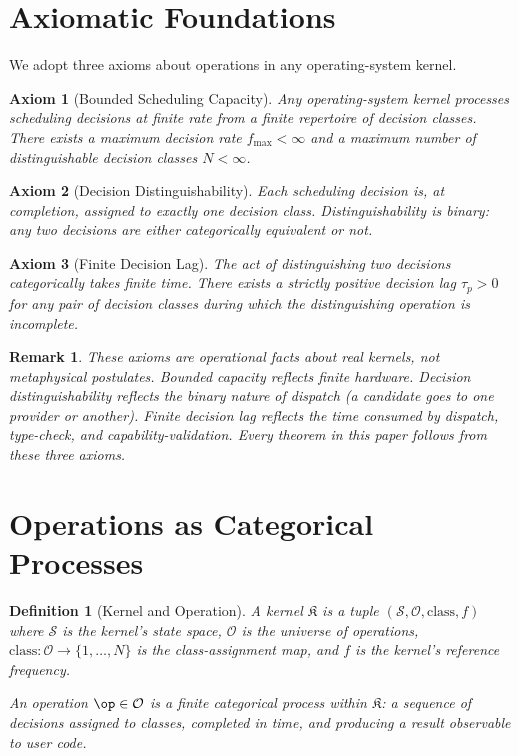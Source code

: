 \documentclass[twocolumn,11pt,a4paper]{article}
\newtheorem{definition}[theorem]{Definition}
\newtheorem{remark}[theorem]{Remark}
\newtheorem{axiom}{Axiom}
\newcommand{\Op}{\mathcal{O}}
\newcommand{\Kernel}{\mathfrak{K}}
\begin{document}
\section{Axiomatic Foundations}
\label{sec:axioms}

We adopt three axioms about operations in any operating-system kernel.

\begin{axiom}[Bounded Scheduling Capacity]
\label{ax:bounded}
Any operating-system kernel processes scheduling decisions at finite rate from a finite repertoire of decision classes. There exists a maximum decision rate $f_\mathrm{max} < \infty$ and a maximum number of distinguishable decision classes $N < \infty$.
\end{axiom}

\begin{axiom}[Decision Distinguishability]
\label{ax:distinguishable}
Each scheduling decision is, at completion, assigned to exactly one decision class. Distinguishability is binary: any two decisions are either categorically equivalent or not.
\end{axiom}

\begin{axiom}[Finite Decision Lag]
\label{ax:lag}
The act of distinguishing two decisions categorically takes finite time. There exists a strictly positive decision lag $\tau_p > 0$ for any pair of decision classes during which the distinguishing operation is incomplete.
\end{axiom}

\begin{remark}
These axioms are operational facts about real kernels, not metaphysical postulates. Bounded capacity reflects finite hardware. Decision distinguishability reflects the binary nature of dispatch (a candidate goes to one provider or another). Finite decision lag reflects the time consumed by dispatch, type-check, and capability-validation. Every theorem in this paper follows from these three axioms.
\end{remark}

\section{Operations as Categorical Processes}
\label{sec:cat}

\begin{definition}[Kernel and Operation]
\label{def:kernel-op}
A \emph{kernel} $\Kernel$ is a tuple $(\mathcal{S}, \Op, \mathrm{class}, f)$ where $\mathcal{S}$ is the kernel's state space, $\Op$ is the universe of operations, $\mathrm{class}: \Op \to \{1, \ldots, N\}$ is the class-assignment map, and $f$ is the kernel's reference frequency.

An \emph{operation} $\op \in \Op$ is a finite categorical process within $\Kernel$: a sequence of decisions assigned to classes, completed in time, and producing a result observable to user code.
\end{definition}
\end{document}
